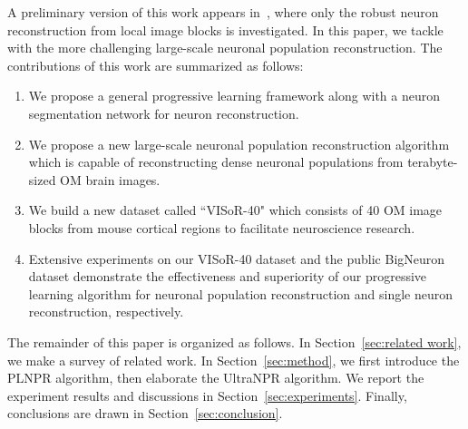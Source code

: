 A preliminary version of this work appears in~\cite{Zhao2019}, where only the robust neuron reconstruction from local image blocks is investigated. In this paper, we tackle with the more challenging large-scale neuronal population reconstruction.
The contributions of this work are summarized as follows:
\begin{enumerate}
\item We propose a general progressive learning framework along with a neuron segmentation network for neuron reconstruction.
\item We propose a new large-scale neuronal population reconstruction algorithm which is capable of reconstructing dense neuronal populations from terabyte-sized OM brain images.
\item We build a new dataset called ``VISoR-40" which consists of 40 OM image blocks from mouse cortical regions to facilitate neuroscience research. %
\item Extensive experiments on our VISoR-40 dataset and the public BigNeuron dataset demonstrate the effectiveness and superiority of our progressive learning algorithm for neuronal population reconstruction and single neuron reconstruction, respectively.
\end{enumerate}

The remainder of this paper is organized as follows. In Section~\ref{sec:related work}, we make a survey of related work. In Section~\ref{sec:method}, we first introduce the PLNPR algorithm, then elaborate the UltraNPR algorithm. We report the experiment results and discussions in Section~\ref{sec:experiments}. Finally, conclusions are drawn in Section~\ref{sec:conclusion}.
